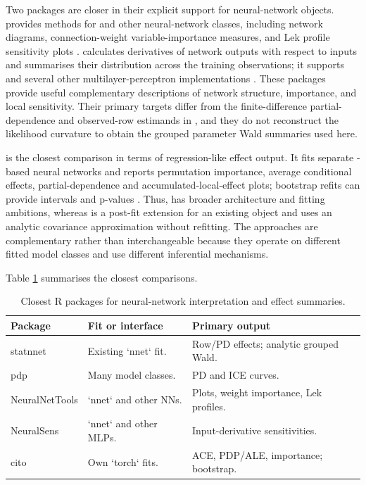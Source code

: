Two packages are closer in their explicit support for neural-network objects.
 provides methods for  and other neural-network classes, including network diagrams, connection-weight variable-importance measures, and Lek profile sensitivity plots \citep{beck2018neuralnettools}.
 calculates derivatives of network outputs with respect to inputs and summarises their distribution across the training observations; it supports  and several other multilayer-perceptron implementations \citep{pizarroso2022neuralsens}.
These packages provide useful complementary descriptions of network structure, importance, and local sensitivity.
Their primary targets differ from the finite-difference partial-dependence and observed-row estimands in , and they do not reconstruct the  likelihood curvature to obtain the grouped parameter Wald summaries used here.

 is the closest comparison in terms of regression-like effect output.
It fits separate -based neural networks and reports permutation importance, average conditional effects, partial-dependence and accumulated-local-effect plots; bootstrap refits can provide intervals and p-values \citep{amesoeder2024cito}.
Thus,  has broader architecture and fitting ambitions, whereas  is a post-fit extension for an existing  object and uses an analytic covariance approximation without refitting.
The approaches are complementary rather than interchangeable because they operate on different fitted model classes and use different inferential mechanisms.

Table \ref{tab:software-comparison-table} summarises the closest comparisons.

\begin{table}

\caption{\label{tab:software-comparison-table}Closest R packages for neural-network interpretation and effect summaries.}
\centering
\begin{tabular}[t]{l|l|l}
\hline
Package & Fit or interface & Primary output\\
\hline
statnnet & Existing `nnet` fit. & Row/PD effects; analytic grouped Wald.\\
\hline
pdp & Many model classes. & PD and ICE curves.\\
\hline
NeuralNetTools & `nnet` and other NNs. & Plots, weight importance, Lek profiles.\\
\hline
NeuralSens & `nnet` and other MLPs. & Input-derivative sensitivities.\\
\hline
cito & Own `torch` fits. & ACE, PDP/ALE, importance; bootstrap.\\
\hline
\end{tabular}
\end{table}


